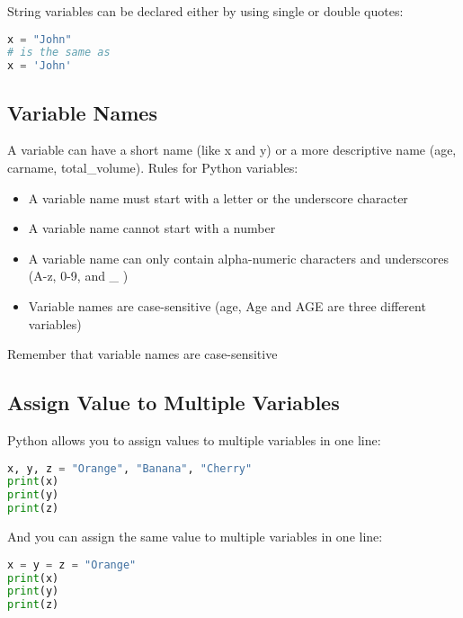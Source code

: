 \documentclass[12pt]{book}
\begin{document}
String variables can be declared either by using single or double quotes:


\lstset{style=mystyle}
\begin{lstlisting}[language=Python, caption=Python example]
x = "John"
# is the same as
x = 'John'
\end{lstlisting}



\subsection{Variable Names}

A variable can have a short name (like x and y) or a more descriptive name (age, carname, total\_volume). Rules for Python variables:


\begin{itemize}
	\item A variable name must start with a letter or the underscore character
	\item A variable name cannot start with a number
	\item A variable name can only contain alpha-numeric characters and underscores (A-z, 0-9, and \_ )
	\item Variable names are case-sensitive (age, Age and AGE are three different variables)
\end{itemize}


Remember that variable names are case-sensitive


\subsection{Assign Value to Multiple Variables}

Python allows you to assign values to multiple variables in one line:


\lstset{style=mystyle}
\begin{lstlisting}[language=Python, caption=Python example]
x, y, z = "Orange", "Banana", "Cherry"
print(x)
print(y)
print(z)
\end{lstlisting}




And you can assign the same value to multiple variables in one line:



\lstset{style=mystyle}
\begin{lstlisting}[language=Python, caption=Python example]
x = y = z = "Orange"
print(x)
print(y)
print(z)
\end{lstlisting}
\end{document}
